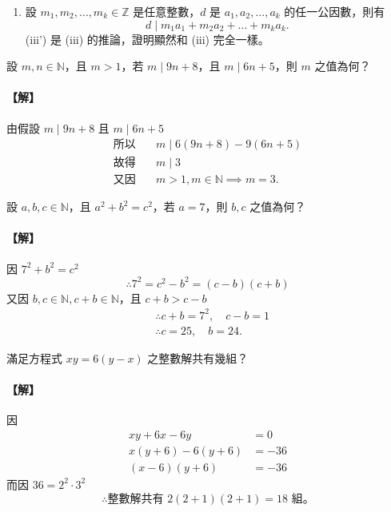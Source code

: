 \begin{enumerate}[label=(\roman*'), start=3]
  \item 設 $m_1, m_2, \dots, m_k \in \mathbb{Z}$ 是任意整數，$d$ 是 $a_1, a_2, \dots, a_k$ 的任一公因數，則有
  \begin{equation*}
    d \mid m_1 a_1 + m_2 a_2 + \dots + m_k a_k.
  \end{equation*}
  (iii') 是 (iii) 的推論，證明顯然和 (iii) 完全一樣。
\end{enumerate}

\begin{example}\label{ex:6-1-4}
設 $m, n \in \mathbb{N}$，且 $m > 1$，若 $m \mid 9n+8$，且 $m \mid 6n+5$，則 $m$ 之值為何？

\paragraph{【解】}
由假設 $m \mid 9n+8$ 且 $m \mid 6n+5$
\begin{align*}
  \text{所以} \quad &m \mid 6(9n+8) - 9(6n+5) \\
  \text{故得} \quad &m \mid 3 \\
  \text{又因} \quad &m > 1, m \in \mathbb{N} \implies m=3.
\end{align*}
\end{example}

\begin{example}\label{ex:6-1-5}
設 $a, b, c \in \mathbb{N}$，且 $a^2+b^2=c^2$，若 $a=7$，則 $b, c$ 之值為何？

\paragraph{【解】}
因 $7^2+b^2=c^2$
\begin{equation*}
  \therefore 7^2 = c^2-b^2 = (c-b)(c+b)
\end{equation*}
又因 $b, c \in \mathbb{N}, c+b \in \mathbb{N}$，且 $c+b > c-b$
\begin{align*}
  &\therefore c+b = 7^2, \quad c-b = 1 \\
  &\therefore c=25, \quad b=24.
\end{align*}
\end{example}

\begin{example}\label{ex:6-1-6}
滿足方程式 $xy=6(y-x)$ 之整數解共有幾組？

\paragraph{【解】}
因
\begin{align*}
  xy+6x-6y &= 0 \\
  x(y+6)-6(y+6) &= -36 \\
  (x-6)(y+6) &= -36
\end{align*}
而因 $36 = 2^2 \cdot 3^2$
\begin{equation*}
  \therefore \text{整數解共有 } 2(2+1)(2+1) = 18 \text{ 組。}
\end{equation*}
\end{example}

